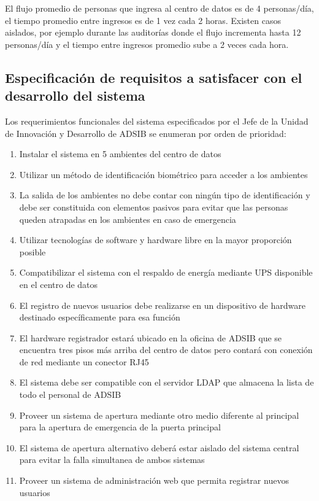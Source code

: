 \documentclass[../principal]{subfiles}
\begin{document}
  El flujo promedio de personas que ingresa al centro de datos es de 4 personas/día, el tiempo promedio entre ingresos es de 1 vez cada 2 horas. Existen casos aislados, por ejemplo durante las auditorías donde el flujo incrementa hasta 12 personas/día y el tiempo entre ingresos promedio sube a 2 veces cada hora.

  \subsection{Especificación de requisitos a satisfacer con el desarrollo del sistema}

  Los requerimientos funcionales del sistema especificados por el Jefe de la Unidad de Innovación y Desarrollo de ADSIB se enumeran por orden de prioridad:
  \begin{enumerate}
    \item Instalar el sistema en 5 ambientes del centro de datos
    \item Utilizar un método de identificación biométrico para acceder a los ambientes
    \item La salida de los ambientes no debe contar con ningún tipo de identificación y debe ser constituida con elementos pasivos para evitar que las personas queden atrapadas en los ambientes en caso de emergencia
    \item Utilizar tecnologías de software y hardware libre en la mayor proporción posible
    \item Compatibilizar el sistema con el respaldo de energía mediante UPS disponible en el centro de datos
    \item El registro de nuevos usuarios debe realizarse en un dispositivo de hardware destinado específicamente para esa función
    \item El hardware registrador estará ubicado en la oficina de ADSIB que se encuentra tres pisos más arriba del centro de datos pero contará con conexión de red mediante un conector RJ45
    \item El sistema debe ser compatible con el servidor LDAP que almacena la lista de todo el personal de ADSIB
    \item Proveer un sistema de apertura mediante otro medio diferente al principal para la apertura de emergencia de la puerta principal
    \item El sistema de apertura alternativo deberá estar aislado del sistema central para evitar la falla simultanea de ambos sistemas
    \item Proveer un sistema de administración web que permita registrar nuevos usuarios

\end{enumerate}
\end{document}
